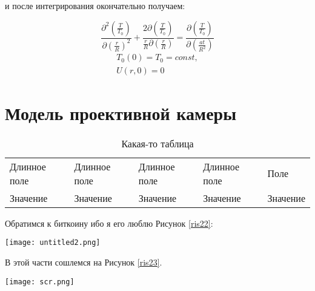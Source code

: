 \documentclass[a4paper, 14pt]{extreport} %
\begin{document}
и после интегрирования окончательно получаем:

\vspace{2cm} 

\begin{equation}
\label{22}
\frac{\partial^2{\left(\frac{T}{T_0}\right)}}{\partial{\left(\frac{r}{R}\right)^2}}+\frac{2\partial{\left(\frac{T}{T_0}\right)}}{\frac{r}{R}\partial{\left(\frac{r}{R}\right)}}=\frac{\partial{\left(\frac{T}{T_0}\right)}}{\partial{\left(\frac{at}{R^2}\right)}}
\end{equation}
\vspace{0.3cm} 
\begin{equation}
\label{23}\begin{split}
T_0(0)=T_0=const,\\
U(r,0)=0
\end{split}\end{equation}

\vspace{0.6cm} 
\section{Модель проективной камеры}


\begin{table}[h]
	\caption{Какая-то таблица}
	\centering
	\begin{tabular}{|l|l|l|l|l|}
		\cline{1-5}
		Длинное поле&Длинное поле&Длинное поле&Длинное поле&Поле\\
		\cline{1-5}
		Значение&Значение&Значение&Значение&Значение\\
		\cline{1-5}
	\end{tabular}
	\label{table}
\end{table}

Обратимся к биткоину ибо я его люблю Рисунок \ref{ris22}:
\begin{center}
	\begin{minipage}{1\linewidth}
		\texttt{[image: untitled2.png]}
		\label{ris22}
	\end{minipage}
\end{center}

\vspace{0.7cm} 
В этой части сошлемся на Рисунок \ref{ris23}. 
\begin{landscape} 
	\begin{center} 
		\begin{minipage}{0.9\linewidth} 
			\texttt{[image: scr.png]} 
			\label{ris23} 
		\end{minipage} 
	\end{center} 
\end{landscape} 
\end{document}
